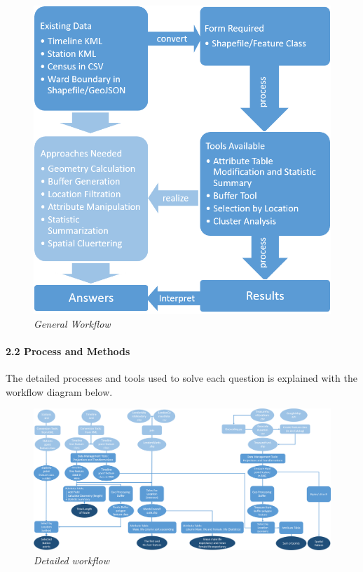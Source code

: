\documentclass[]{article}
\let\oldparagraph\paragraph
\renewcommand{\paragraph}[1]{\oldparagraph{#1}\mbox{}}
\begin{document}
\begin{figure}
\centering
\includegraphics{Part2/pngs/solutionflow.png}
\caption{\emph{General Workflow}}
\end{figure}

\paragraph{2.2 Process and Methods}\label{process-and-methods}

The detailed processes and tools used to solve each question is
explained with the workflow diagram below.

\begin{figure}
\centering
\includegraphics{Part2/pngs/processflow.png}
\caption{\emph{Detailed workflow}}
\end{figure}
\end{document}
